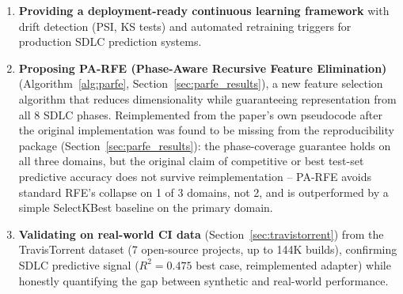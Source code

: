 \documentclass[technologies,article,submit,pdftex,moreauthors]{Definitions/mdpi}
\begin{document}
\begin{enumerate}
  (Section~\ref{sec:travistorrent}) -- repository age leads 0 of 7 projects, while
  Test-phase metrics lead 5 of 7. This qualitative ranking is directionally
  consistent with, not contradicting, this synthetic-domain finding, but a
  robustness check excluding the one Test-phase feature that is
  definitionally part of the build-duration target
  (\texttt{tr\_\allowbreak log\_\allowbreak testduration}) shows the \emph{quantitative} signal was doing
  most of the work: with it excluded, every one of the 7 projects'
  best-model holdout \(R^2\) turns negative, so TravisTorrent no longer
  demonstrates real-world predictive power for any project, even though
  the surviving feature ranking still points the same direction. The underlying
  inter-metric correlations are also hand-specified in the copula
  generator's configuration rather than independently emergent (Section~\ref{sec:internal_validity}), so this synthetic-domain result should still be read as a
  hypothesis rather than independently validated, and the real-data picture
  is a weak, partial corroboration at best -- not a resolved contradiction.
\item
  \textbf{Providing a deployment-ready continuous learning framework}
  with drift detection (PSI, KS tests) and automated retraining triggers
  for production SDLC prediction systems.
\item
  \textbf{Proposing PA-RFE (Phase-Aware Recursive Feature Elimination)}
  (Algorithm~\ref{alg:parfe},
  Section~\ref{sec:parfe_results}), a new feature
  selection algorithm that reduces dimensionality while guaranteeing
  representation from all 8 SDLC phases. Reimplemented from the paper's
  own pseudocode after the original implementation was found to be
  missing from the reproducibility package (Section~\ref{sec:parfe_results}): the
  phase-coverage guarantee holds on all three domains, but the original
  claim of competitive or best test-set predictive accuracy does not
  survive reimplementation -- PA-RFE avoids standard RFE's collapse on 1
  of 3 domains, not 2, and is outperformed by a simple SelectKBest
  baseline on the primary domain.
\item
  \textbf{Validating on real-world CI data}
  (Section~\ref{sec:travistorrent}) from the
  TravisTorrent dataset (7 open-source projects, up to 144K builds),
  confirming SDLC predictive signal (\(R^2 = 0.475\) best case,
  reimplemented adapter) while honestly quantifying the gap between
  synthetic and real-world performance.
\end{enumerate}
\end{document}
